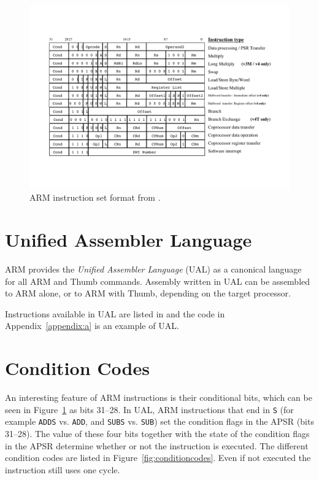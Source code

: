 \documentclass[oneside,a4paper]{report}
\begin{document}
\begin{figure}[htbp]
	\centering
	\includegraphics[width=1.0\textwidth]{./fig/InstructionFormat.pdf}
	\caption{ARM instruction set format from \cite[p. 13]{ARMInst}.}
	\label{fig:instructionformat}
\end{figure}

\section{Unified Assembler Language}
ARM provides the \emph{Unified Assembler Language} (UAL) as a canonical language for all ARM and Thumb commands. Assembly written in UAL can be assembled to ARM alone, or to ARM with Thumb, depending on the target processor.

Instructions available in UAL are listed in \cite{ARMRef} and the code in Appendix~\ref{appendix:a} is an example of UAL.

\section{Condition Codes}\label{sec:conditioncodes}
An interesting feature of ARM instructions is their conditional bits, which can be seen in Figure~\ref{fig:instructionformat} as bits 31--28. In UAL, ARM instructions that end in \texttt{S} (for example \texttt{ADDS} vs. \texttt{ADD}, and \texttt{SUBS} vs. \texttt{SUB}) set the condition flags in the APSR (bits 31--28). The value of these four bits together with the state of the condition flags in the APSR determine whether or not the instruction is executed. The different condition codes are listed in Figure~\ref{fig:conditioncodes}. Even if not executed the instruction still uses one cycle.
\end{document}
